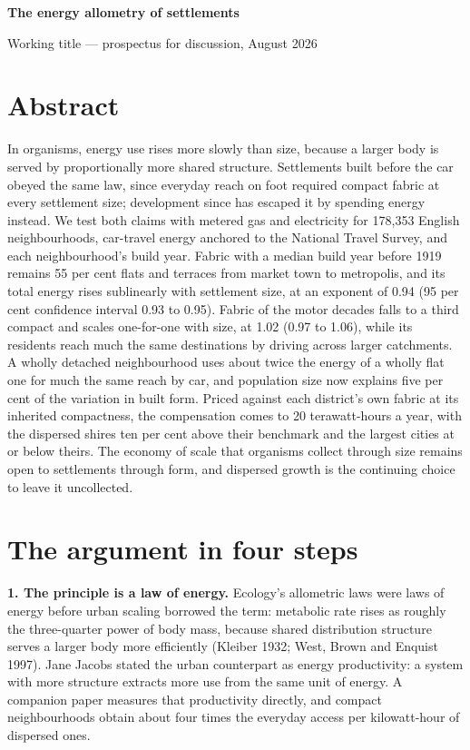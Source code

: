 \documentclass[10pt]{article}
\begin{document}
{\LARGE\bfseries The energy allometry of settlements}

\vspace{2pt}
{\large Working title --- prospectus for discussion, August 2026}

\section*{Abstract}

In organisms, energy use rises more slowly than size, because a larger body is
served by proportionally more shared structure. Settlements built before the
car obeyed the same law, since everyday reach on foot required compact fabric
at every settlement size; development since has escaped it by spending energy
instead. We test both claims with metered gas and electricity for 178,353
English neighbourhoods, car-travel energy anchored to the National Travel
Survey, and each neighbourhood's build year. Fabric with a median build year
before 1919 remains 55 per cent flats and terraces from market town to
metropolis, and its total energy rises sublinearly with settlement size, at an
exponent of 0.94 (95 per cent confidence interval 0.93 to 0.95). Fabric of the
motor decades falls to a third compact and scales one-for-one with size, at
1.02 (0.97 to 1.06), while its residents reach much the same destinations by
driving across larger catchments. A wholly detached neighbourhood uses about
twice the energy of a wholly flat one for much the same reach by car, and
population size now explains five per cent of the variation in built form.
Priced against each district's own fabric at its inherited compactness, the
compensation comes to 20 terawatt-hours a year, with the dispersed shires ten
per cent above their benchmark and the largest cities at or below theirs. The
economy of scale that organisms collect through size remains open to
settlements through form, and dispersed growth is the continuing choice to
leave it uncollected.

\section*{The argument in four steps}

\textbf{1. The principle is a law of energy.} Ecology's allometric laws were
laws of energy before urban scaling borrowed the term: metabolic rate rises as
roughly the three-quarter power of body mass, because shared distribution
structure serves a larger body more efficiently (Kleiber 1932; West, Brown and
Enquist 1997). Jane Jacobs stated the urban counterpart as energy
productivity: a system with more structure extracts more use from the same
unit of energy. A companion paper measures that productivity directly, and
compact neighbourhoods obtain about four times the everyday access per
kilowatt-hour of dispersed ones.
\end{document}

